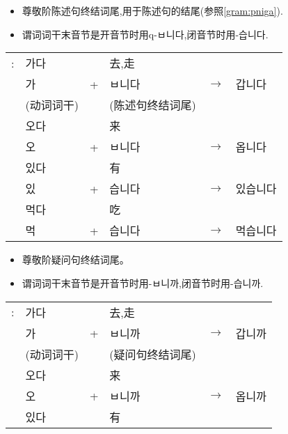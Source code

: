 \section{\kr{}}
\begin{grammar}
    \begin{grammarsect}
        \begin{itemize}
            \item 尊敬阶陈述句终结词尾,用于陈述句的结尾(参照\ref{gram:pniga}).
            \item 谓词词干末音节是开音节时用q{\kr -ㅂ니다},闭音节时用{\kr -습니다.}
        \end{itemize}
        \begin{tabular}{llllll}
            \kr \ruby{例}{예}:&\kr 가다&&去,走\\
            &\kr 가&+&\kr ㅂ니다&$\to$&\kr 갑니다\\
            &(动词词干)&&(陈述句终结词尾)\\
            &\kr 오다&&来\\
            &\kr 오&+&\kr ㅂ니다&$\to$&\kr 옵니다\\
            &\kr 있다&&有\\
            &\kr 있&+&\kr 습니다&$\to$&\kr 있습니다\\
            &\kr 먹다&&吃\\
            &\kr 먹&+&\kr 습니다&$\to$&\kr 먹습니다\\
        \end{tabular}
    \end{grammarsect}
    \begin{grammarsect}\label{gram:pniga}
        \begin{itemize}
            \item 尊敬阶疑问句终结词尾。
            \item 谓词词干末音节是开音节时用-ㅂ니까,闭音节时用-습니까.
        \end{itemize}
        \begin{tabular}{llllll}
            \kr \ruby{例}{예}:&\kr 가다&&去,走\\
            &\kr 가&+&\kr ㅂ니까&$\to$&\kr 갑니까\\
            &(动词词干)&&(疑问句终结词尾)\\
            &\kr 오다&&来\\
            &\kr 오&+&\kr ㅂ니까&$\to$&\kr 옵니까\\
            &\kr 있다&&有\\

\end{tabular}
\end{grammarsect}
\end{grammar}

